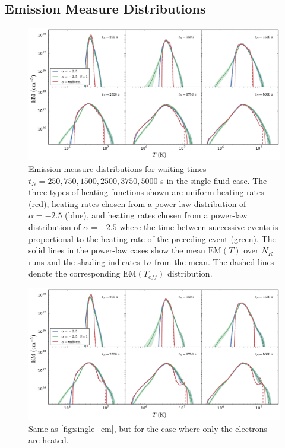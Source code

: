 \documentclass[apj]{emulateapj}
\begin{document}
	\subsection{Emission Measure Distributions}
	\label{subsec:em_dist}
	\begin{figure}[t]
		\centering
		\includegraphics[width=2\columnwidth]{figures/em_grid_single_a25.pdf}
		\caption{Emission measure distributions for waiting-times $t_N=250,750,1500,2500,3750,5000$ s in the single-fluid case. The three types of heating functions shown are uniform heating rates (red), heating rates chosen from a power-law distribution of $\alpha=-2.5$ (blue), and heating rates chosen from a power-law distribution of $\alpha=-2.5$ where the time between successive events is proportional to the heating rate of the preceding event (green). The solid lines in the power-law cases show the mean $\mathrm{EM}(T)$ over $N_R$ runs and the shading indicates $1\sigma$ from the mean. The dashed lines denote the corresponding $\mathrm{EM}(T_{eff})$ distribution.}
		\label{fig:single_em}
	\end{figure}
	\begin{figure}[t]
		\centering
		\includegraphics[width=2\columnwidth]{figures/em_grid_electron_a25.pdf}
		\caption{Same as \autoref{fig:single_em}, but for the case where only the electrons are heated.}
		\label{fig:el_em}
	\end{figure}
\end{document}

